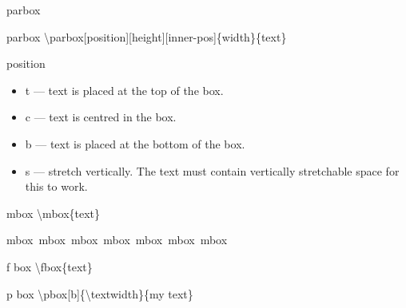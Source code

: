 \documentclass[ aspectratio=149,  14pt,blue,xcolor=pdftex,dvipsnames,table,handout,notes]{beamer}
\begin{document}
		\begin{frame}[t]{parbox}

			\begin{block} {parbox}
			\textbackslash parbox[position][height][inner-pos]\{width\}\{text\}
			\end{block}

			\begin{block}{position}
			\begin{itemize}
			\item	t --- text is placed at the top of the box.
			\item	c --- text is centred in the box.
			\item	b --- text is placed at the bottom of the box.
			\item	s --- stretch vertically. The text must contain vertically stretchable space for this to work.
			\end{itemize}
			\end{block}


			\begin{block} {mbox}
			\textbackslash mbox\{text\}
			\end{block}

			\begin{example}
			\mbox{mbox mbox mbox mbox mbox mbox mbox}
			\end{example}


			\begin{block} {f box}
			\textbackslash fbox\{text\}
			\end{block}

			\begin{example}
			\end{example}


			\begin{block} {p box}
			\textbackslash pbox[b]\{\textbackslash textwidth\}\{my text\}
			\end{block}

			\begin{example}
			\end{example}



\end{frame}
\end{document}
